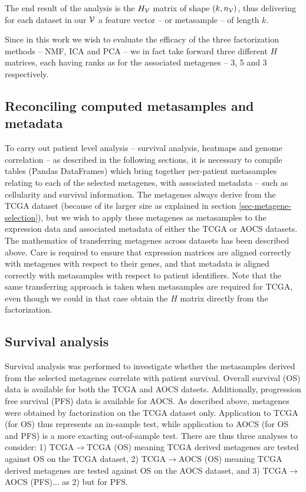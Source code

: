 \documentclass[tikz, 12pt,a4paper,oneside,fleqn]{article}
\begin{document}
The end result of the analysis is the $H_{\mathcal{V}}$ matrix of shape $(k, n_{\mathcal{V}})$, thus delivering for each dataset in our $\mathcal{V}$ a feature vector -- or metasample -- of length $k$. 

Since in this work we wish to evaluate the efficacy of the three factorization methods -- NMF, ICA and PCA -- we in fact take forward three different $H$ matrices, each having ranks as for the associated metagenes -- 3, 5 and 3 respectively.

\subsection{Reconciling computed metasamples and metadata}
\label{sec-reconciling-metasamples-metadata}

To carry out patient level analysis -- survival analysis, heatmaps and genome correlation -- as described in the following sections, it is necessary to compile tables (Pandas DataFrames) which bring together per-patient metasamples relating to each of the selected metagenes, with associated metadata -- such as cellularity and survival information.   The metagenes always derive from the TCGA dataset (because of its larger size as explained in section \ref{sec-metagene-selection}), but we wish to apply these metagenes as metasamples to the expression data and associated metadata of either the TCGA or AOCS datasets.   
The mathematics of transferring metagenes across datasets has been described above.  Care is required to ensure that expression matrices are aligned correctly with metagenes with respect to their genes, and that metadata is aligned correctly with metasamples with respect to patient identifiers.
Note that the same transferring approach is taken when metasamples are required for TCGA, even though we could in that case obtain the $H$ matrix directly from the factorization.


\subsection{Survival analysis}
\label{sec-survival-analysis}

Survival analysis was performed to investigate whether the metasamples derived from the selected metagenes correlate with patient survival.  Overall  survival (OS) data is available for both the TCGA and AOCS datsets.  Additionally, progression free survival (PFS) data is available for AOCS.   As described above,  metagenes were obtained by factorization on the TCGA dataset only.  Application to TCGA (for OS) thus represents an in-sample test, while application to AOCS (for OS and PFS) is a more exacting out-of-sample test. There are thus three analyses to consider: 
1) TCGA$\rightarrow$TCGA (OS) meaning TCGA derived metagenes are tested against OS on the TCGA dataset, 2) TCGA$\rightarrow$AOCS (OS) meaning TCGA derived metagenes are tested against OS on the AOCS dataset, and 3) TCGA$\rightarrow$AOCS (PFS)... as 2) but for PFS. 
\end{document}
